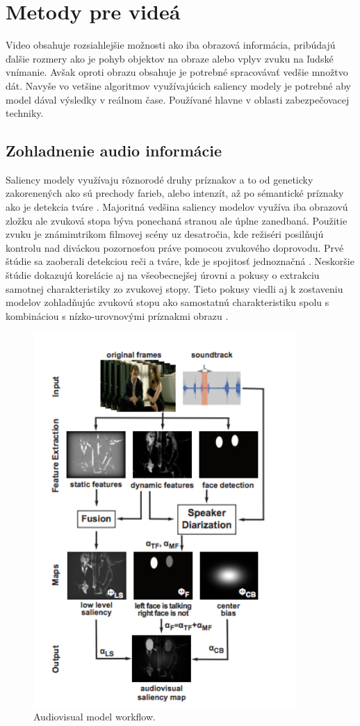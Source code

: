 \section{Metody pre videá}
Video obsahuje rozsiahlejšie možnosti ako iba obrazová informácia, pribúdajú ďalšie rozmery ako je pohyb objektov na obraze alebo vplyv zvuku na ľudské vnímanie. Avšak oproti obrazu obsahuje je potrebné spracovávať vedšie množtvo
dát. Navyše vo vetšine algoritmov využívajúcich saliency modely je potrebné aby model dával výsledky v reálnom čase. Používané hlavne v oblasti zabezpečovacej techniky.
\subsection{Zohladnenie audio informácie}
Saliency modely využívaju rôznorodé druhy príznakov a to od geneticky zakorenených ako sú prechody farieb, alebo intenzít, až po sémantické príznaky ako je detekcia tváre \cite{salient-faces}. Majoritná vedšina saliency modelov využíva iba obrazovú zložku ale zvuková stopa býva ponechaná stranou ale úplne zanedbaná. Použitie zvuku je známimtrikom filmovej scény uz desatročia, kde režiséri posilňujú kontrolu nad diváckou pozornosťou práve pomocou zvukového doprovodu. Prvé štúdie sa zaoberali detekciou reči a tváre, kde je spojitosť jednoznačná \cite{sound-1}. Neskoršie štúdie dokazujú korelácie aj na všeobecnejšej úrovni a pokusy o extrakciu samotnej charakteristiky zo zvukovej stopy\cite{sound-coutrot-1}. Tieto pokusy viedli aj k zostaveniu modelov zohladňujúc zvukovú stopu ako samostatnú charakteristiku spolu s kombináciou s nízko-urovnovými príznakmi obrazu \cite{sound-courot-2}.

\begin{figure}[H]
  \centering
  \includegraphics[width=10cm]{pics/courot-1.png}
  \caption{Audiovisual model workflow.\cite{sound-courot-2}}\label{wrap-fig:4}
\end{figure}
\vspace{10mm}

